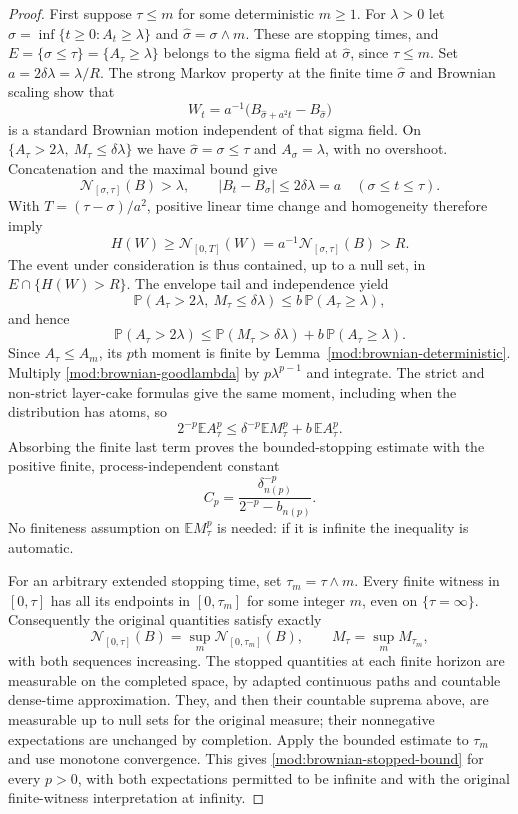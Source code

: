 \documentclass[11pt]{article}
\numberwithin{equation}{section}
\theoremstyle{remark}
\theoremstyle{definition}
\begin{document}
\begin{proof}
First suppose $\tau\le m$ for some deterministic $m\ge1$. For $\lambda>0$
let $\sigma=\inf\{t\ge0:A_t\ge\lambda\}$ and
$\widehat\sigma=\sigma\wedge m$. These are stopping times, and
$E=\{\sigma\le\tau\}=\{A_\tau\ge\lambda\}$ belongs to the sigma
field at $\widehat\sigma$, since $\tau\le m$.
Set $a=2\delta\lambda=\lambda/R$. The strong Markov property at the
finite time $\widehat\sigma$ and Brownian scaling show that
\[
 W_t=a^{-1}\bigl(B_{\widehat\sigma+a^2t}-B_{\widehat\sigma}\bigr)
\]
is a standard Brownian motion independent of that sigma field.
On $\{A_\tau>2\lambda,\ M_\tau\le\delta\lambda\}$ we have
$\widehat\sigma=\sigma\le\tau$ and $A_\sigma=\lambda$, with no
overshoot. Concatenation and the maximal bound give
\[
 \mathcal N_{[\sigma,\tau]}(B)>\lambda,
 \qquad |B_t-B_\sigma|\le2\delta\lambda=a
 \quad(\sigma\le t\le\tau).
\]
With $T=(\tau-\sigma)/a^2$, positive linear time change and
homogeneity therefore imply
\[
 H(W)\ge\mathcal N_{[0,T]}(W)
       =a^{-1}\mathcal N_{[\sigma,\tau]}(B)>R.
\]
The event under consideration is thus contained, up to a null set,
in $E\cap\{H(W)>R\}$. The envelope tail and independence yield
\[
 \mathbb P(A_\tau>2\lambda,\ M_\tau\le\delta\lambda)
 \le b\,\mathbb P(A_\tau\ge\lambda),
\]
and hence
\begin{equation}\label{mod:brownian-goodlambda}
 \mathbb P(A_\tau>2\lambda)
 \le\mathbb P(M_\tau>\delta\lambda)
     +b\,\mathbb P(A_\tau\ge\lambda).
\end{equation}
Since $A_\tau\le A_m$, its $p$th moment is finite by
Lemma~\ref{mod:brownian-deterministic}. Multiply
\eqref{mod:brownian-goodlambda} by $p\lambda^{p-1}$ and integrate.
The strict and non-strict layer-cake formulas give the same moment,
including when the distribution has atoms, so
\[
 2^{-p}\mathbb E A_\tau^p
 \le\delta^{-p}\mathbb E M_\tau^p+b\,\mathbb E A_\tau^p.
\]
Absorbing the finite last term proves the bounded-stopping estimate
with the positive finite, process-independent constant
\[
 C_p=\frac{\delta_{n(p)}^{-p}}{2^{-p}-b_{n(p)}}.
\]
No finiteness assumption on $\mathbb E M_\tau^p$ is needed: if it
is infinite the inequality is automatic.

For an arbitrary extended stopping time, set $\tau_m=\tau\wedge m$.
Every finite witness in $[0,\tau]$ has all its endpoints in
$[0,\tau_m]$ for some integer $m$, even on $\{\tau=\infty\}$.
Consequently the original quantities satisfy exactly
\[
 \mathcal N_{[0,\tau]}(B)=\sup_m\mathcal N_{[0,\tau_m]}(B),
 \qquad M_\tau=\sup_m M_{\tau_m},
\]
with both sequences increasing. The stopped quantities at each finite
horizon are measurable on the completed space, by adapted continuous
paths and countable dense-time approximation. They, and then their
countable suprema above, are measurable up to null sets for the original
measure; their nonnegative expectations are unchanged by completion.
Apply the bounded estimate to $\tau_m$ and use monotone convergence.
This gives \eqref{mod:brownian-stopped-bound} for every $p>0$, with
both expectations permitted to be infinite and with the original
finite-witness interpretation at infinity.
\end{proof}
\end{document}
